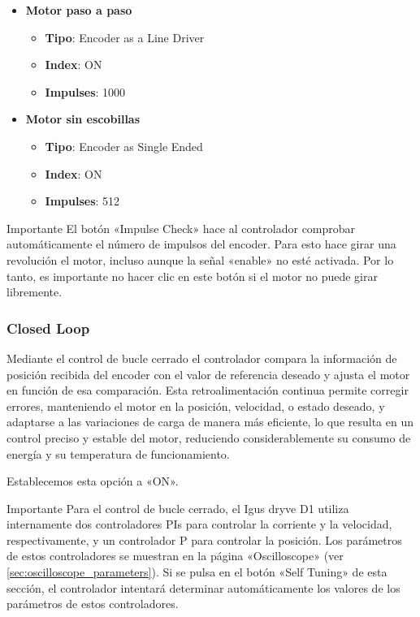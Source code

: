 \documentclass[english,spanish,a4paper,11pt]{article}
\begin{document}
\begin{itemize}
    \item \textbf{Motor paso a paso}
    \begin{itemize}
        \item \textbf{Tipo}: Encoder as a Line Driver
        \item \textbf{Index}: ON
        \item \textbf{Impulses}: 1000
    \end{itemize}
    
    \item \textbf{Motor sin escobillas}
    \begin{itemize}
        \item \textbf{Tipo}: Encoder as Single Ended
        \item \textbf{Index}: ON
        \item \textbf{Impulses}: 512
    \end{itemize}
\end{itemize}

\begin{admonition}{Importante}
    El botón «Impulse Check» hace al controlador comprobar automáticamente el número de impulsos del encoder. Para esto hace girar una revolución el motor, incluso aunque la señal «enable» no esté activada. Por lo tanto, es importante no hacer clic en este botón si el motor no puede girar libremente.
\end{admonition}


\subsubsection{Closed Loop}

Mediante el control de bucle cerrado el controlador compara la información de posición recibida del encoder con el valor de referencia deseado y ajusta el motor en función de esa comparación. Esta retroalimentación continua permite corregir errores, manteniendo el motor en la posición, velocidad, o estado deseado, y adaptarse a las variaciones de carga de manera más eficiente, lo que resulta en un control preciso y estable del motor, reduciendo considerablemente su consumo de energía y su temperatura de funcionamiento.

Establecemos esta opción a «ON».

\begin{admonition}{Importante}
    Para el control de bucle cerrado, el Igus dryve D1 utiliza internamente dos controladores \acp{PI} para controlar la corriente y la velocidad, respectivamente, y un controlador \ac{P} para controlar la posición. Los parámetros de estos controladores se muestran en la página «Oscilloscope» (ver \cref{sec:oscilloscope_parameters}). Si se pulsa en el botón «Self Tuning» de esta sección, el controlador intentará determinar automáticamente los valores de los parámetros de estos controladores.
\end{admonition}
\end{document}

